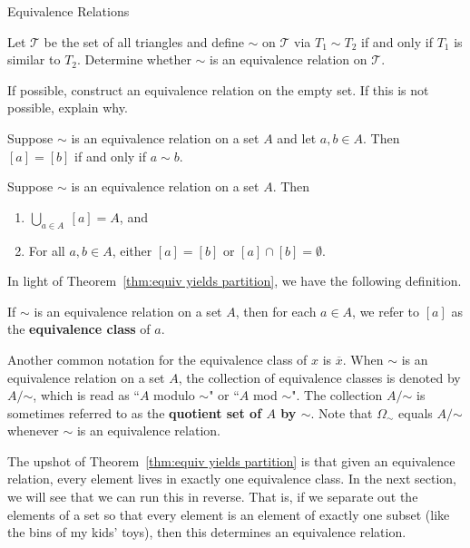 \begin{section}{Equivalence Relations}
\begin{problem}
Let $\mathcal{T}$ be the set of all triangles and define $\sim$ on $\mathcal{T}$ via $T_1\sim T_2$ if and only if $T_1$ is similar to $T_2$.  Determine whether $\sim$ is an equivalence relation on $\mathcal{T}$.
\end{problem}

\begin{problem}
If possible, construct an equivalence relation on the empty set.  If this is not possible, explain why.
\end{problem}

\begin{theorem}\label{thm:related if and only if same class}
Suppose $\sim$ is an equivalence relation on a set $A$ and let $a,b\in A$.  Then $[a]=[b]$ if and only if $a\sim b$.
\end{theorem}

\begin{theorem}\label{thm:equiv yields partition}
Suppose $\sim$ is an equivalence relation on a set $A$.  Then
\begin{enumerate}[label=\textrm{(\alph*)}]
\item $\displaystyle \bigcup_{a\in A}\ [a]=A$, and
\item For all $a,b\in A$, either $[a]=[b]$ or $[a]\cap [b]=\emptyset$.
\end{enumerate}
\end{theorem}

In light of Theorem~\ref{thm:equiv yields partition}, we have the following definition.

\begin{definition}\label{def:equivalence class}
If $\sim$ is an equivalence relation on a set $A$, then for each $a\in A$, we refer to $[a]$ as the \textbf{equivalence class} of $a$.
\end{definition}

Another common notation for the equivalence class of $x$ is $\overline{x}$.  When $\sim$ is an equivalence relation on a set $A$, the collection of equivalence classes is denoted by $A/\mathord\sim$, which is read as ``$A$ modulo $\sim$" or ``$A$ mod $\sim$".  The collection $A/\mathord\sim$ is sometimes referred to as the \textbf{quotient set of $A$ by $\sim$}. Note that $\Omega_{\sim}$ equals $A/\mathord\sim$ whenever $\sim$ is an equivalence relation.

The upshot of Theorem~\ref{thm:equiv yields partition} is that given an equivalence relation, every element lives in exactly one equivalence class.  In the next section, we will see that we can run this in reverse.  That is, if we separate out the elements of a set so that every element is an element of exactly one subset (like the bins of my kids' toys), then this determines an equivalence relation.


\end{section}
